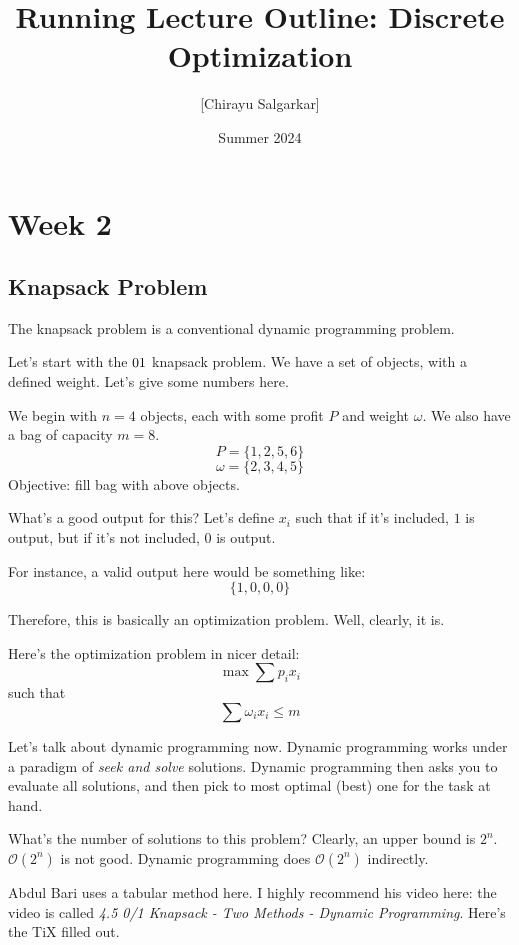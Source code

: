 \documentclass[10pt, oneside]{article}
\title{Running Lecture Outline: Discrete Optimization}
\author{[Chirayu Salgarkar]}
\date{Summer 2024}
\begin{document}
\maketitle
\tableofcontents

\vspace{.25in}

\section{Week 2}

\subsection{Knapsack Problem}

The knapsack problem is a conventional dynamic programming problem. 

Let's start with the $0 \/ 1$ knapsack problem. We have a set of objects, with a defined weight. Let's give some numbers here.

We begin with $n = 4$ objects, each with some profit $P$ and weight $\omega$. We also have a bag of capacity $m = 8$.
\[ P = \{1, 2, 5, 6\}\]
\[ \omega = \{2, 3, 4, 5\} \]
Objective: fill bag with above objects. 

What's a good output for this? Let's define $x_i$ such that if it's included, $1$ is output, but if it's not included, $0$ is output. 

For instance, a valid output here would be something like:
\[ \{1, 0, 0, 0\} \]

Therefore, this is basically an optimization problem. Well, clearly, it is. 

Here's the optimization problem in nicer detail: 
\[ \max \sum p_ix_i\]
such that
\[ \sum \omega_ix_i \leq m \]

Let's talk about dynamic programming now. 
Dynamic programming works under a paradigm of \textit{seek and solve} solutions. Dynamic programming then asks you to evaluate all solutions, and then pick to most optimal (best) one for the task at hand.

What's the number of solutions to this problem? Clearly, an upper bound is $2^n$. 
$\mathcal{O}(2^n)$ is not good. Dynamic programming does $\mathcal{O}(2^n)$ indirectly. 

Abdul Bari uses a tabular method here. I highly recommend his video here: the video is called \textit{4.5 0/1 Knapsack - Two Methods - Dynamic Programming}. Here's the TiX filled out. 
\end{document}
